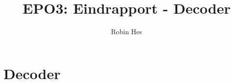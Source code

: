 \documentclass{scrartcl} %
\title{EPO3: Eindrapport - Decoder}
\author{Robin Hes}
\begin{document}
\chapter{Decoder}
\label{ch:decoder}
\end{document}
